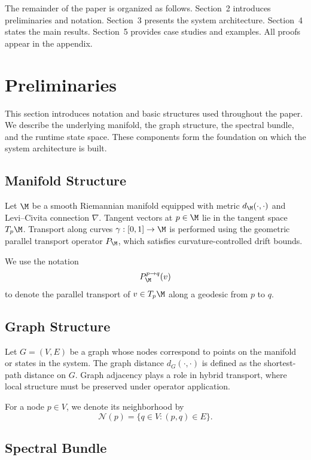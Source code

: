 \documentclass[11pt]{article}
\begin{document}
The remainder of the paper is organized as follows. Section~2 introduces
preliminaries and notation. Section~3 presents the system architecture.
Section~4 states the main results. Section~5 provides case studies and
examples. All proofs appear in the appendix.

\section{Preliminaries}

This section introduces notation and basic structures used throughout the
paper. We describe the underlying manifold, the graph structure, the
spectral bundle, and the runtime state space. These components form the
foundation on which the system architecture is built.

\subsection{Manifold Structure}

Let $\M$ be a smooth Riemannian manifold equipped with metric
$d_\M(\cdot,\cdot)$ and Levi--Civita connection $\nabla$. Tangent vectors
at $p \in \M$ lie in the tangent space $T_p\M$. Transport along curves
$\gamma : [0,1] \to \M$ is performed using the geometric parallel
transport operator $P_\M$, which satisfies curvature-controlled drift
bounds.

We use the notation
\[
P_\M^{p \to q}(v)
\]
to denote the parallel transport of $v \in T_p\M$ along a geodesic from
$p$ to $q$.

\subsection{Graph Structure}

Let $G = (V,E)$ be a graph whose nodes correspond to points on the
manifold or states in the system. The graph distance $d_G(\cdot,\cdot)$
is defined as the shortest-path distance on $G$. Graph adjacency plays a
role in hybrid transport, where local structure must be preserved under
operator application.

For a node $p \in V$, we denote its neighborhood by
\[
\mathcal{N}(p) = \{ q \in V : (p,q) \in E \}.
\]

\subsection{Spectral Bundle}
\end{document}
